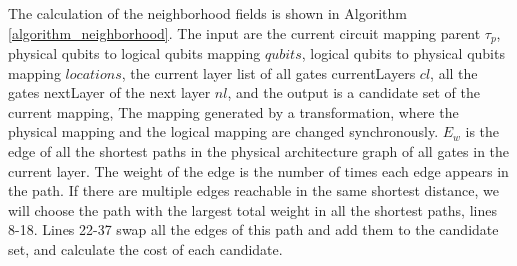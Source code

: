 \documentclass[runningheads]{llncs}
\begin{document}
The calculation of the neighborhood fields is shown in Algorithm \ref{algorithm_neighborhood}. 
The input are the current circuit mapping parent $\tau_{p}$, physical qubits to logical qubits mapping $qubits$, 
logical qubits to physical qubits mapping $locations$, the current layer list of all gates currentLayers $cl$, 
all the gates nextLayer of the next layer $nl$, and the output is a candidate set of the current mapping, 
The mapping generated by a transformation, where the physical mapping and the logical mapping 
are changed synchronously. $E_{w}$ is the edge of all the shortest paths in the physical architecture 
graph of all gates in the current layer. The weight of the edge is the number of times each edge appears 
in the path. If there are multiple edges reachable in the same shortest distance, 
we will choose the path with the largest total weight in all the shortest paths, 
lines 8-18.
Lines 22-37 swap all the edges of this path and add them to the candidate set, 
and calculate the cost of each candidate.
\end{document}
